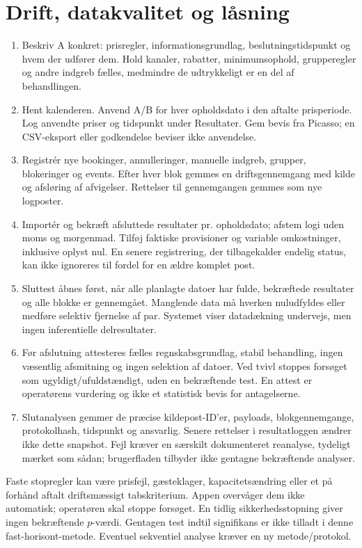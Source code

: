 \documentclass[11pt,a4paper]{article}
\begin{document}
\section{Drift, datakvalitet og låsning}
\begin{enumerate}
\item Beskriv A konkret: prisregler, informationsgrundlag, beslutningstidspunkt og
hvem der udfører dem. Hold kanaler, rabatter, minimumsophold, grupperegler og
andre indgreb fælles, medmindre de udtrykkeligt er en del af behandlingen.
\item Hent kalenderen. Anvend A/B for hver opholdsdato i den aftalte prisperiode.
Log anvendte priser og tidspunkt under Resultater. Gem bevis fra Picasso;
en CSV-eksport eller godkendelse beviser ikke anvendelse.
\item Registrér nye bookinger, annulleringer, manuelle indgreb, grupper,
blokeringer og events. Efter hver blok gemmes en driftsgennemgang med kilde og
afsløring af afvigelser. Rettelser til gennemgangen gemmes som nye logposter.
\item Importér og bekræft afsluttede resultater pr. opholdsdato; afstem logi
uden moms og morgenmad. Tilføj faktiske provisioner og variable omkostninger,
inklusive oplyst nul. En senere registrering, der tilbagekalder endelig status,
kan ikke ignoreres til fordel for en ældre komplet post.
\item Sluttest åbnes først, når alle planlagte datoer har fulde, bekræftede
resultater og alle blokke er gennemgået. Manglende data må hverken nuludfyldes
eller medføre selektiv fjernelse af par. Systemet viser datadækning undervejs,
men ingen inferentielle delresultater.
\item Før afslutning attesteres fælles regnskabsgrundlag, stabil behandling,
ingen væsentlig afsmitning og ingen selektion af datoer. Ved tvivl stoppes
forsøget som ugyldigt/ufuldstændigt, uden en bekræftende test. En attest er
operatørens vurdering og ikke et statistisk bevis for antagelserne.
\item Slutanalysen gemmer de præcise kildepost-ID'er, payloads, blokgennemgange,
protokolhash, tidspunkt og ansvarlig. Senere rettelser i resultatloggen ændrer
ikke dette snapshot. Fejl kræver en særskilt dokumenteret reanalyse, tydeligt
mærket som sådan; brugerfladen tilbyder ikke gentagne bekræftende analyser.
\end{enumerate}

Faste stopregler kan være prisfejl, gæsteklager, kapacitetsændring eller et
på forhånd aftalt driftsmæssigt tabskriterium. Appen overvåger dem ikke automatisk;
operatøren skal stoppe forsøget. En tidlig sikkerhedsstopning giver ingen
bekræftende $p$-værdi. Gentagen test indtil signifikans er ikke tilladt i denne
fast-horisont-metode. Eventuel sekventiel analyse kræver en ny metode/protokol.
\end{document}
